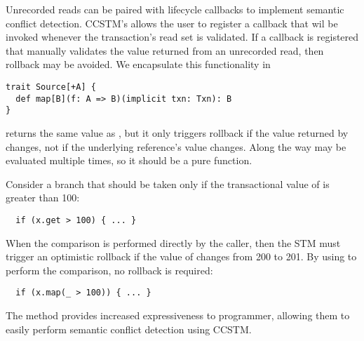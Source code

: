 Unrecorded reads can be paired with lifecycle callbacks to implement semantic
conflict detection.  CCSTM's  allows the user to register a callback
that wil be invoked whenever the transaction's read set is validated.  If a
callback is registered that manually validates the value returned from an
unrecorded read, then rollback may be avoided.  We encapsulate this
functionality in
\lstset{numbers=none}
\begin{lstlisting}
trait Source[+A] {
  def map[B](f: A => B)(implicit txn: Txn): B
}
\end{lstlisting}
\lstset{numbers=left}
 returns the same value as , but it only
triggers rollback if the value returned by  changes, not if the
underlying reference's value changes.  Along the way  may be evaluated
multiple times, so it should be a pure function.

Consider a branch that should be taken only if the transactional value of
 is greater than 100:
\lstset{numbers=none}
\begin{lstlisting}
  if (x.get > 100) { ... }
\end{lstlisting}
\lstset{numbers=left}
When the comparison is performed directly by the caller, then the STM must
trigger an optimistic rollback if the value of  changes from 200 to
201.  By using  to perform the comparison, no rollback is required:
\lstset{numbers=none}
\begin{lstlisting}
  if (x.map(_ > 100)) { ... }
\end{lstlisting}
\lstset{numbers=left}
The  method provides increased expressiveness to programmer,
allowing them to easily perform semantic conflict detection using CCSTM.



